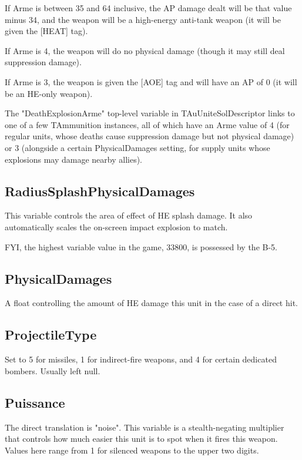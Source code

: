\documentclass{article}
\begin{document}
If Arme is between 35 and 64 inclusive, the AP damage dealt will be that value minus 34, and the weapon will be a high-energy anti-tank weapon (it will be given the [HEAT] tag).

If Arme is 4, the weapon will do no physical damage (though it may still deal suppression damage).

If Arme is 3, the weapon is given the [AOE] tag and will have an AP of 0 (it will be an HE-only weapon).

The "DeathExplosionArme" top-level variable in TAuUniteSolDescriptor links to one of a few TAmmunition instances, all of which have an Arme value of 4 (for regular units, whose deaths cause suppression damage but not physical damage) or 3 (alongside a certain PhysicalDamages setting, for supply units whose explosions may damage nearby allies).

\subsection{RadiusSplashPhysicalDamages}

This variable controls the area of effect of HE splash damage. It also automatically scales the on-screen impact explosion to match.

FYI, the highest variable value in the game, 33800, is possessed by the B-5.

\subsection{PhysicalDamages}

A float controlling the amount of HE damage this unit in the case of a direct hit.

\subsection{ProjectileType}

Set to 5 for missiles, 1 for indirect-fire weapons, and 4 for certain dedicated bombers. Usually left null.

\subsection{Puissance}

The direct translation is "noise". This variable is a stealth-negating multiplier that controls how much easier this unit is to spot when it fires this weapon. Values here range from 1 for silenced weapons to the upper two digits.
\end{document}
